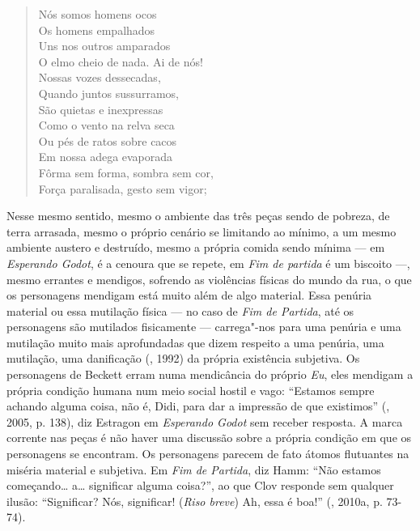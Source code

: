 \begin{verse}
Nós somos homens ocos\\
Os homens empalhados\\
Uns nos outros amparados\\
O elmo cheio de nada. Ai de nós!\\
Nossas vozes dessecadas,\\
Quando juntos sussurramos,\\
São quietas e inexpressas\\
Como o vento na relva seca\\
Ou pés de ratos sobre cacos\\
Em nossa adega evaporada\\
Fôrma sem forma, sombra sem cor,\\
Força paralisada, gesto sem vigor;
\end{verse}

Nesse mesmo sentido, mesmo o ambiente das três peças sendo de pobreza,
de terra arrasada, mesmo o próprio cenário se limitando ao mínimo, a um
mesmo ambiente austero e destruído, mesmo a própria comida sendo mínima
--- em \emph{Esperando Godot}, é a cenoura que se repete, em \emph{Fim de
partida} é um biscoito ---, mesmo errantes e mendigos, sofrendo as
violências físicas do mundo da rua, o que os personagens mendigam está
muito além de algo material. Essa penúria material ou essa mutilação
física --- no caso de \emph{Fim de Partida}, até os personagens são
mutilados fisicamente --- carrega"-nos para uma penúria e uma mutilação
muito mais aprofundadas que dizem respeito a uma penúria, uma mutilação,
uma danificação (, 1992) da própria existência subjetiva. Os
personagens de Beckett erram numa mendicância do próprio \emph{Eu}, eles
mendigam a própria condição humana num meio social hostil e vago:
``Estamos sempre achando alguma coisa, não é, Didi, para dar a impressão
de que existimos'' (, 2005, p. 138), diz Estragon em
\emph{Esperando Godot} sem receber resposta. A marca corrente nas peças
é não haver uma discussão sobre a própria condição em que os personagens
se encontram. Os personagens parecem de fato átomos flutuantes na
miséria material e subjetiva. Em \emph{Fim de Partida}, diz Hamm: ``Não
estamos começando\ldots{} a\ldots{} significar alguma coisa?'', ao que Clov
responde sem qualquer ilusão: ``Significar? Nós, significar! (\emph{Riso
breve}) Ah, essa é boa!'' (, 2010a, p. 73-74).

